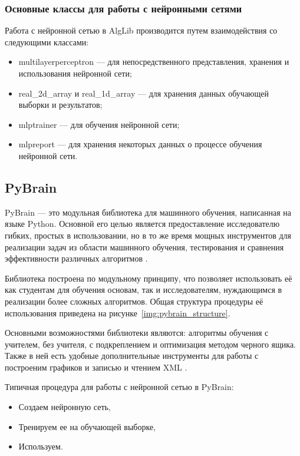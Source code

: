 \subsubsection{Основные классы для работы с нейронными сетями}

Работа с нейронной сетью в AlgLib производится путем взаимодействия со
следующими классами:

\begin{itemize}
    \item multilayerperceptron — для непосредственного представления, хранения и
        использования нейронной сети;
    \item real\_2d\_array и real\_1d\_array — для хранения данных обучающей
        выборки и результатов;
    \item mlptrainer — для обучения нейронной сети;
    \item mlpreport — для хранения некоторых данных о процессе обучения
        нейронной сети.
\end{itemize}

\subsection{PyBrain}

PyBrain — это модульная библиотека для машинного обучения, написанная на языке
Python. Основной его целью является предоставление исследователю гибких, простых
в использовании, но в то же время мощных инструментов для реализации задач из
области машинного обучения, тестирования и сравнения эффективности различных
алгоритмов \cite{habra_pybrain}.

Библиотека построена по модульному принципу, что позволяет использовать её как
студентам для обучения основам, так и исследователям, нуждающимся в реализации
более сложных алгоритмов. Общая структура процедуры её использования приведена
на рисунке~\ref{img:pybrain_structure}.


Основными возможностями библиотеки являются: алгоритмы обучения с учителем, без
учителя, с подкреплением и оптимизация методом черного ящика. Также в ней есть
удобные дополнительные инструменты для работы с построеним графиков и записью и
чтением XML \cite{pybrain}.

Типичная процедура для работы с нейронной сетью в PyBrain:

\begin{itemize}
    \item Создаем нейронную сеть,
    \item Тренируем ее на обучающей выборке,
    \item Используем.
\end{itemize}

